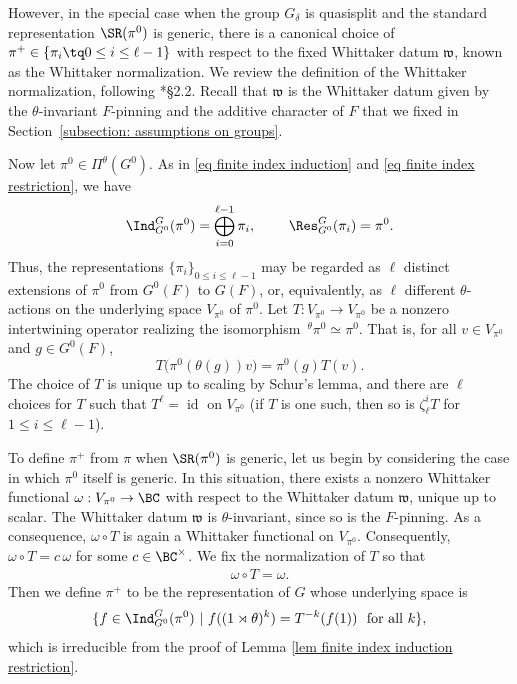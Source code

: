 \documentclass[11pt,letterpaper]{amsart}
\numberwithin{equation}{section}
\begin{document}
However, in the special case when the group $G_\delta$ is quasisplit and the standard representation $\SR(\pi^0)$ is generic, there is a canonical choice of $\pi^+ \in \{\pi_i \tq 0 \leq i \leq \ell-1 \}$ with respect to the fixed Whittaker datum $\mathfrak{w}$, known as the Whittaker normalization. We review the definition of the Whittaker normalization, following \cite{Art13}*{\S 2.2}. Recall that $\mathfrak{w}$ is the Whittaker datum given by the $\theta$-invariant $F$-pinning and the additive character of $F$ that we fixed in Section~\ref{subsection: assumptions on groups}.

Now let $\pi^0 \in \Pi^{\theta}(G^0)$. As in \eqref{eq finite index induction} and \eqref{eq finite index restriction}, we have
\[
\Ind_{G^0}^{G}(\pi^0)= \bigoplus_{i=0}^{\ell -1} \pi_i, \ \ \ \ \ \ \ \Res_{G^0}^{G}(\pi_i) = \pi^0.
\]
Thus, the representations $\{\pi_i\}_{0 \leq i \leq \ell-1}$ may be regarded as $\ell$ distinct extensions of $\pi^0$ from $G^0(F)$ to $G(F)$, or, equivalently, as $\ell$ different $\theta$-actions on the underlying space $V_{\pi^0}$ of $\pi^0$.
Let $T: V_{\pi^0} \to V_{\pi^0}$ be a nonzero intertwining operator realizing the isomorphism $\,^{\theta}\pi^0 \simeq \pi^0$. That is, for all $v \in V_{\pi^0}$ and $g \in G^0(F)$,
\[
T\big(\pi^0(\theta(g)) v\big) = \pi^0(g) T(v).
\]
The choice of $T$ is unique up to scaling by Schur's lemma, and there are $\ell$ choices for $T$ such that $T^{\ell} = \operatorname{id}$ on $V_{\pi^0}$ (if $T$ is one such, then so is $\zeta_\ell^{i} T$ for $1 \leq i \leq \ell-1$).


To define $\pi^+$ from $\pi$ when $\SR(\pi^0)$ is generic, let us begin by considering the case in which $\pi^0$ itself is generic. In this situation, there exists a nonzero Whittaker functional $\omega: V_{\pi^0} \rightarrow \BC$ with respect to the Whittaker datum $\mathfrak{w}$, unique up to scalar. The Whittaker datum $\mathfrak{w}$ is $\theta$-invariant, since so is the $F$-pinning. As a consequence, $\omega \circ T$ is again a Whittaker functional on $V_{\pi^0}$. Consequently, $\omega \circ T = c\, \omega$ for some $c \in \BC^\times$. We fix the normalization of $T$ so that
\begin{align}\label{eq Whittaker normalization intertwining}
    \omega \circ T = \omega.
\end{align}
Then we define {\it $\pi^+$}\IN{$\pi^+$} to be the representation of $G$ whose underlying space is
\[ \{f \in \Ind_{G^0}^{G}(\pi^0) \ | \ f( (1 \rtimes \theta)^k)= T^{-k}(f(1)) \ \text{ for all }k  \},\]
which is irreducible from the proof of Lemma \ref{lem finite index induction restriction}.
\end{document}
